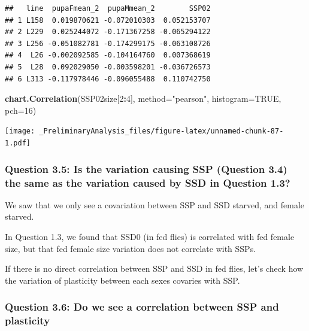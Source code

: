 \documentclass[
]{article}
\newenvironment{Shaded}{\begin{snugshade}}{\end{snugshade}}
\newcommand{\DataTypeTok}[1]{\textcolor[rgb]{0.13,0.29,0.53}{#1}}
\newcommand{\DecValTok}[1]{\textcolor[rgb]{0.00,0.00,0.81}{#1}}
\newcommand{\KeywordTok}[1]{\textcolor[rgb]{0.13,0.29,0.53}{\textbf{#1}}}
\newcommand{\NormalTok}[1]{#1}
\newcommand{\OperatorTok}[1]{\textcolor[rgb]{0.81,0.36,0.00}{\textbf{#1}}}
\newcommand{\OtherTok}[1]{\textcolor[rgb]{0.56,0.35,0.01}{#1}}
\newcommand{\StringTok}[1]{\textcolor[rgb]{0.31,0.60,0.02}{#1}}
\begin{document}
\begin{verbatim}
##   line  pupaFmean_2  pupaMmean_2        SSP02
## 1 L158  0.019870621 -0.072010303  0.052153707
## 2 L229  0.025244072 -0.171367258 -0.065294122
## 3 L256 -0.051082781 -0.174299175 -0.063108726
## 4  L26 -0.002092585 -0.104164760  0.007368619
## 5  L28  0.092029050 -0.003598201 -0.036726573
## 6 L313 -0.117978446 -0.096055488  0.110742750
\end{verbatim}

\begin{Shaded}
\begin{Highlighting}[]
\KeywordTok{chart.Correlation}\NormalTok{(SSP02size[}\DecValTok{2}\OperatorTok{:}\DecValTok{4}\NormalTok{],}
                   \DataTypeTok{method=}\StringTok{"pearson"}\NormalTok{,}
                   \DataTypeTok{histogram=}\OtherTok{TRUE}\NormalTok{,}
                   \DataTypeTok{pch=}\DecValTok{16}\NormalTok{)}
\end{Highlighting}
\end{Shaded}

\texttt{[image: \_PreliminaryAnalysis\_files/figure-latex/unnamed-chunk-87-1.pdf]}

\hypertarget{question-3.5-is-the-variation-causing-ssp-question-3.4-the-same-as-the-variation-caused-by-ssd-in-question-1.3}{%
\subsubsection{Question 3.5: Is the variation causing SSP (Question 3.4)
the same as the variation caused by SSD in Question
1.3?}\label{question-3.5-is-the-variation-causing-ssp-question-3.4-the-same-as-the-variation-caused-by-ssd-in-question-1.3}}

We saw that we only see a covariation between SSP and SSD starved, and
female starved.

In Question 1.3, we found that SSD0 (in fed flies) is correlated with
fed female size, but that fed female size variation does not correlate
with SSPs.

If there is no direct correlation between SSP and SSD in fed flies,
let's check how the variation of plasticity between each sexes covaries
with SSP.

\hypertarget{question-3.6-do-we-see-a-correlation-between-ssp-and-plasticity}{%
\subsubsection{Question 3.6: Do we see a correlation between SSP and
plasticity}\label{question-3.6-do-we-see-a-correlation-between-ssp-and-plasticity}}
\end{document}
